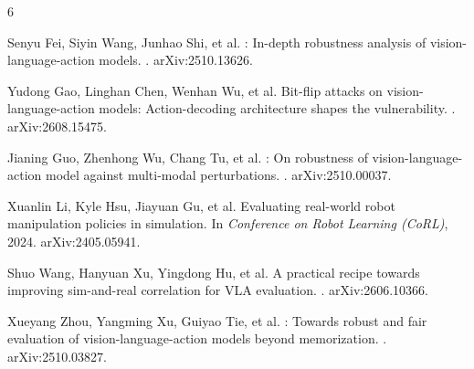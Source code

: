 \documentclass{article}
\begin{document}
\begin{thebibliography}{6}

Senyu Fei, Siyin Wang, Junhao Shi, et al.
: In-depth robustness analysis of vision-language-action models.
. arXiv:2510.13626.

Yudong Gao, Linghan Chen, Wenhan Wu, et al.
\newblock Bit-flip attacks on vision-language-action models: Action-decoding architecture shapes
the vulnerability.
. arXiv:2608.15475.

Jianing Guo, Zhenhong Wu, Chang Tu, et al.
: On robustness of vision-language-action model against multi-modal
perturbations.
. arXiv:2510.00037.

Xuanlin Li, Kyle Hsu, Jiayuan Gu, et al.
\newblock Evaluating real-world robot manipulation policies in simulation.
\newblock In \emph{Conference on Robot Learning (CoRL)}, 2024. arXiv:2405.05941.

Shuo Wang, Hanyuan Xu, Yingdong Hu, et al.
\newblock A practical recipe towards improving sim-and-real correlation for {VLA} evaluation.
. arXiv:2606.10366.

Xueyang Zhou, Yangming Xu, Guiyao Tie, et al.
: Towards robust and fair evaluation of vision-language-action models beyond
memorization.
. arXiv:2510.03827.

\end{thebibliography}
\end{document}
